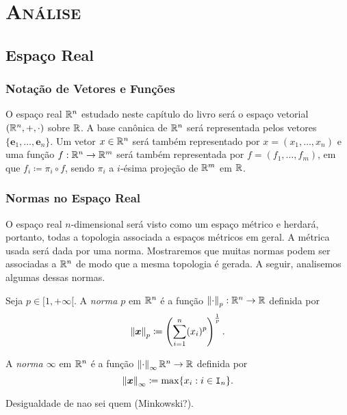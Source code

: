 \part{{\scshape Análise}}


\chapter{Espaço Real}

\section{Notação de Vetores e Funções}

	O espaço real $\mathbb{R}^n$ estudado neste capítulo do livro será o espaço vetorial $(\mathbb{R}^n,+,\cdot)$ sobre $\mathbb{R}$. A base canônica de $\mathbb{R}^n$ será representada pelos vetores $\{\bm e_1, \ldots, \bm e_n\}$. Um vetor $x \in \mathbb{R}^n$ será também representado por $x=(x_1,\ldots,x_n)$ e uma função $f: \mathbb{R}^n \to \mathbb{R}^m$ será também representada por $f=(f_1,\ldots,f_m)$, em que $f_i \coloneqq \pi_i \circ f$, sendo $\pi_i$ a $i$-ésima projeção de $\mathbb{R}^m$ em $\mathbb{R}$.

\section{Normas no Espaço Real}

	O espaço real $n$-dimensional será visto como um espaço métrico e herdará, portanto, todas a topologia associada a espaços métricos em geral. A métrica usada será dada por uma norma. Mostraremos que muitas normas podem ser associadas a $\mathbb{R}^n$ de modo que a mesma topologia é gerada. A seguir, analisemos algumas dessas normas.
	
\begin{defi}
	Seja $p \in [1,+\infty[$. A \emph{norma $p$} em $\mathbb{R}^n$ é a função $\left\Vert{\cdot}\right\Vert_p: \mathbb{R}^n \to \mathbb{R}$ definida por
	\begin{equation*}
	\left\Vert{\bm x}\right\Vert_p \coloneqq \left( \sum_{i=1}^n (x_i)^p \right)^{\frac{1}{p}}.
	\end{equation*}
	
	A \emph{norma $\infty$} em $\mathbb{R}^n$ é a função $\left\Vert{\cdot}\right\Vert_\infty \mathbb{R}^n \to \mathbb{R}$ definida por
	\begin{equation*}
	\left\Vert{\bm x}\right\Vert_\infty \coloneqq \max \{x_i : i \in \mathtt I_n \}.
	\end{equation*}
\end{defi}

\begin{prop}
	Desigualdade de nao sei quem (Minkowski?).
\end{prop}


